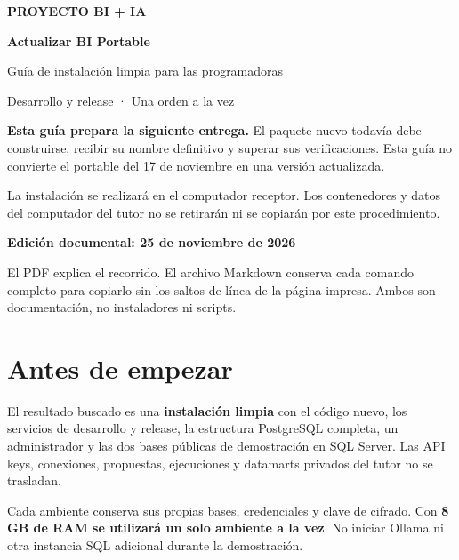 \documentclass[
  spanish,
  10pt,
  a4paper,
]{article}
\author{}
\date{}
\begin{document}
\begin{titlepage}
\vspace*{12mm}
{\color{TealBI}\sffamily\bfseries PROYECTO BI + IA\par}
\vspace{10mm}
{\color{NavyBI}\sffamily\bfseries\fontsize{29}{34}\selectfont Actualizar BI Portable\par}
\vspace{5mm}
{\Large Guía de instalación limpia para las programadoras\par}
\vspace{10mm}
{\large Desarrollo y release · Una orden a la vez\par}
\vspace{12mm}
\begin{tcolorbox}[colback=PaleBI,colframe=TealBI,boxrule=.6pt,arc=2mm]
\textbf{Esta guía prepara la siguiente entrega.} El paquete nuevo todavía debe construirse, recibir su nombre definitivo y superar sus verificaciones. Esta guía no convierte el portable del 17 de noviembre en una versión actualizada.
\end{tcolorbox}
\vspace{8mm}
La instalación se realizará en el computador receptor. Los contenedores y datos del computador del tutor no se retirarán ni se copiarán por este procedimiento.
\vfill
{\color{TealBI}\bfseries Edición documental: 25 de noviembre de 2026\par}
\vspace{4mm}
El PDF explica el recorrido. El archivo Markdown conserva cada comando completo para copiarlo sin los saltos de línea de la página impresa. Ambos son documentación, no instaladores ni scripts.
\end{titlepage}

\tableofcontents
\clearpage

\section{Antes de empezar}\label{antes-de-empezar}

El resultado buscado es una \textbf{instalación limpia} con el código
nuevo, los servicios de desarrollo y release, la estructura PostgreSQL
completa, un administrador y las dos bases públicas de demostración en
SQL Server. Las API keys, conexiones, propuestas, ejecuciones y
datamarts privados del tutor no se trasladan.

Cada ambiente conserva sus propias bases, credenciales y clave de
cifrado. Con \textbf{8 GB de RAM se utilizará un solo ambiente a la
vez}. No iniciar Ollama ni otra instancia SQL adicional durante la
demostración.
\end{document}
